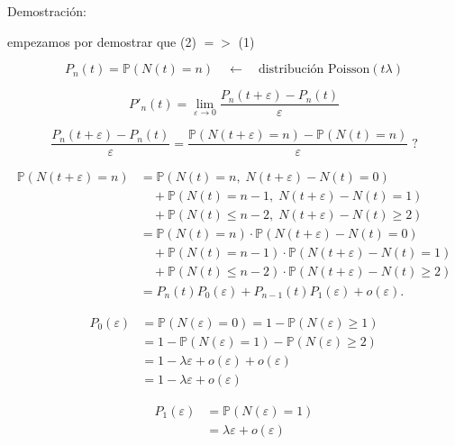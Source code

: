 \documentclass[12pt,a4paper]{article}
\begin{document}
Demostración:

empezamos por demostrar que (2) $= >$ (1)

\begin{equation*}
P_n(t) = \mathbb{P}(N(t) = n) \quad \longleftarrow \quad \text{distribución Poisson}(t\lambda)
\end{equation*}

\begin{equation*}
P'_n(t) = \lim_{\varepsilon \to 0} \frac{P_n(t+\varepsilon) - P_n(t)}{\varepsilon}
\end{equation*}

\begin{equation*}
\frac{P_n(t+\varepsilon) - P_n(t)}{\varepsilon}
= \frac{\mathbb{P}(N(t+\varepsilon)=n) - \mathbb{P}(N(t)=n)}{\varepsilon}\; ?
\end{equation*}

\begin{align*}
\mathbb{P}(N(t+\varepsilon) = n) 
&= \mathbb{P}(N(t)=n,\; N(t+\varepsilon)-N(t)=0) \\
&\quad + \mathbb{P}(N(t)=n-1,\; N(t+\varepsilon)-N(t)=1) \\
&\quad + \mathbb{P}(N(t)\leq n-2,\; N(t+\varepsilon)-N(t)\geq 2) \\
&= \mathbb{P}(N(t)=n)\cdot \mathbb{P}(N(t+\varepsilon)-N(t)=0) \\
&\quad + \mathbb{P}(N(t)=n-1)\cdot \mathbb{P}(N(t+\varepsilon)-N(t)=1) \\
&\quad + \mathbb{P}(N(t)\leq n-2)\cdot \mathbb{P}(N(t+\varepsilon)-N(t)\geq 2) \\
&= P_n(t)P_0(\varepsilon) + P_{n-1}(t)P_1(\varepsilon) + o(\varepsilon).
\end{align*}


\begin{align*}
P_0(\varepsilon) &= \mathbb{P}(N(\varepsilon)=0) 
= 1 - \mathbb{P}(N(\varepsilon)\geq 1) \\
&= 1 - \mathbb{P}(N(\varepsilon)=1) - \mathbb{P}(N(\varepsilon)\geq 2) \\
&= 1 - \lambda \varepsilon + o(\varepsilon) + o(\varepsilon) \\
&= 1 - \lambda \varepsilon + o(\varepsilon)
\end{align*}

\begin{align*}
P_1(\varepsilon) &= \mathbb{P}(N(\varepsilon)=1) \\
&= \lambda \varepsilon + o(\varepsilon)
\end{align*}
\end{document}
